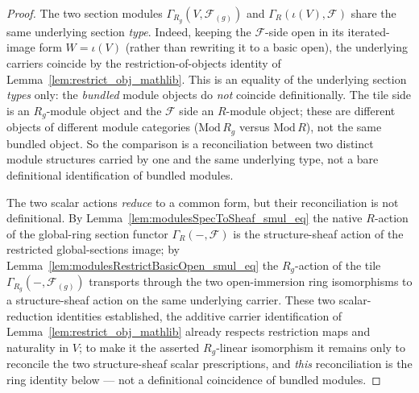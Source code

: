 \begin{proof}
  The two section modules \(\Gamma_{R_g}(V,\mathcal{F}_{(g)})\) and \(\Gamma_R(\iota(V),\mathcal{F})\)
  share the same underlying section \emph{type}. Indeed, keeping the \(\mathcal{F}\)-side open in its
  iterated-image form \(W = \iota(V)\) (rather than rewriting it to a basic open), the underlying carriers
  coincide by the restriction-of-objects identity of Lemma~\ref{lem:restrict_obj_mathlib}. This is an
  equality of the underlying section \emph{types} only: the \emph{bundled} module objects do \emph{not}
  coincide definitionally. The tile side is an \(R_g\)-module object and the \(\mathcal{F}\) side an
  \(R\)-module object; these are different objects of different module categories
  (\(\mathrm{Mod}\,R_g\) versus \(\mathrm{Mod}\,R\)), not the same bundled object. So the comparison is a
  reconciliation between two distinct module structures carried by one and the same underlying type, not a
  bare definitional identification of bundled modules.

  The two scalar actions \emph{reduce} to a common form, but their reconciliation is not definitional. By
  Lemma~\ref{lem:modulesSpecToSheaf_smul_eq} the native \(R\)-action of the global-ring section functor
  \(\Gamma_R(-,\mathcal{F})\) is the structure-sheaf action of the restricted global-sections image; by
  Lemma~\ref{lem:modulesRestrictBasicOpen_smul_eq} the \(R_g\)-action of the tile
  \(\Gamma_{R_g}(-,\mathcal{F}_{(g)})\) transports through the two open-immersion ring isomorphisms to a
  structure-sheaf action on the same underlying carrier. These two scalar-reduction identities
  established, the additive carrier identification of Lemma~\ref{lem:restrict_obj_mathlib} already
  respects restriction maps and naturality in \(V\); to make it the asserted \(R_g\)-linear isomorphism it
  remains only to reconcile the two structure-sheaf scalar prescriptions, and \emph{this} reconciliation
  is the ring identity below --- not a definitional coincidence of bundled modules.


\end{proof}
